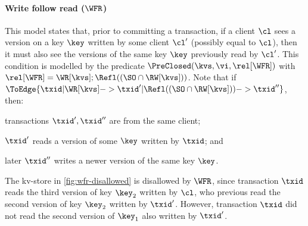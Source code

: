 \paragraph{Write follow read (\(\WFR \))} 
\label{sec:et-wfr} 
This model states that, prior to committing a transaction, 
if a client \(\cl\) sees a version on a key \(\key\) written by some client \(\cl'\) (possibly equal to \(\cl\)), 
then it must also see the versions of the same key \(\key\) previously read by \(\cl'\). 
This condition is modelled by the predicate \( \PreClosed(\kvs,\vi,\rel[\WFR]) \)
with \( \rel[\WFR] = \WR[\kvs] ; \Refl((\SO \cap \RW[\kvs]))\).
Note that if \( \ToEdge{\txid | \WR[\kvs] -> \txid' | \Refl((\SO \cap \RW[\kvs])) -> \txid'' } \),
then:
\begin{enumerate*}
\item transactions \( \txid',\txid'' \) are from the same client;
\item \( \txid' \) reads a version of some \( \key \) written by \( \txid \); and 
\item later \( \txid'' \) writes a newer version of the same key \( \key \).
\end{enumerate*}
The kv-store in \cref{fig:wfr-disallowed} is disallowed by \(\WFR\),
since transaction \(\txid\) reads the third version of key \( \key_2 \) written by \(\cl\),
who previous read the second version of key \(\key_2 \) written by \( \txid' \).
However, transaction \(\txid\) did not read the second version of \( \key_1 \) also written by \( \txid' \).

